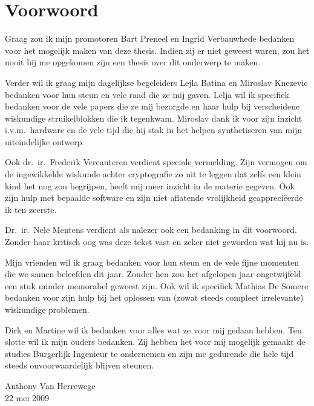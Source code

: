 \chapter*{Voorwoord}

Graag zou ik mijn promotoren Bart Preneel en Ingrid Verbauwhede bedanken voor het mogelijk maken van deze thesis. Indien zij er niet geweest waren, zou het nooit bij me opgekomen zijn een thesis over dit onderwerp te maken.

Verder wil ik graag mijn dagelijkse begeleiders Lejla Batina en \mbox{Miroslav} Knezevic bedanken voor hun steun en vele raad die ze mij gaven. Lelja wil ik specifiek bedanken voor de vele papers die ze mij bezorgde en haar hulp bij verscheidene wiskundige struikelblokken die ik tegenkwam. Miroslav dank ik voor zijn inzicht i.v.m.\ hardware en de vele tijd die hij stak in het helpen synthetiseren van mijn uiteindelijke ontwerp.

Ook dr.\ ir.\ Frederik Vercauteren verdient speciale vermelding. Zijn vermogen om de ingewikkelde wiskunde achter cryptografie zo uit te leggen dat zelfs een klein kind het nog zou begrijpen, heeft mij meer inzicht in de materie gegeven. Ook zijn hulp met bepaalde software en zijn niet aflatende vrolijkheid geappreci\"eerde ik ten zeerste.

Dr.\ ir.\ Nele Mentens verdient als nalezer ook een bedanking in dit voorwoord. Zonder haar kritisch oog was deze tekst vast en zeker niet geworden wat hij nu is.

Mijn vrienden wil ik graag bedanken voor hun steun en de vele fijne momenten die we samen beleefden dit jaar. Zonder hen zou het afgelopen jaar ongetwijfeld een stuk minder memorabel geweest zijn. Ook wil ik specifiek Mathias De Somere bedanken voor zijn hulp bij het oplossen van (zowat steeds compleet irrelevante) wiskundige problemen.

Dirk en Martine wil ik bedanken voor alles wat ze voor mij gedaan hebben. Ten slotte wil ik mijn ouders bedanken. Zij hebben het voor mij mogelijk gemaakt de studies Burgerlijk Ingenieur te ondernemen en zijn me gedurende die hele tijd steeds onvoorwaardelijk blijven steunen. 

\bigskip \bigskip
{\raggedleft	%
Anthony Van Herrewege\\
22 mei 2009\\
}
